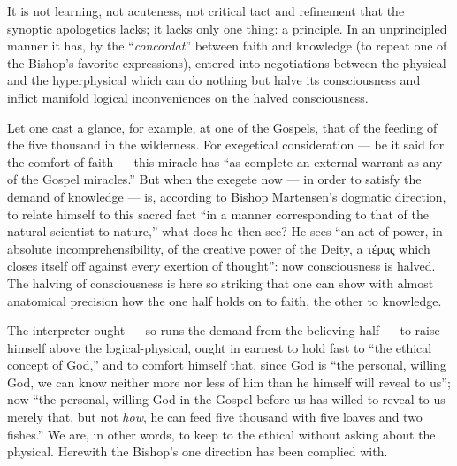 \documentclass[12pt]{book}
\newcommand{\opage}[1]{\marginnote{\footnotesize\textit{[#1]}}}
\begin{document}
It is not learning, not acuteness, not critical tact and refinement that the synoptic apologetics lacks; it lacks only one thing: a principle. In an unprincipled manner it has, by the ``\emph{concordat}'' between faith and knowledge (to repeat one of the Bishop's favorite expressions), entered into negotiations between the physical and the hyperphysical which can do nothing but halve its consciousness and inflict manifold logical inconveniences on the halved consciousness.

Let one cast a glance, for example, at one of the Gospels, that of the feeding of the five thousand in the wilderness. For exegetical consideration --- be it said for the comfort of faith --- this miracle has ``as complete an external warrant as any of the Gospel miracles.'' But when the exegete now --- in order to satisfy the demand of knowledge --- is, according to Bishop Martensen's dogmatic direction, to relate himself to this sacred fact ``in a manner corresponding to that of the natural scientist to nature,'' what does he then see? He sees ``an act of power, in absolute incomprehensibility, of the creative power of the Deity, a τέρας which closes itself off against every exertion of thought'': now consciousness is halved. The halving of consciousness is here so striking that one can show with almost anatomical precision how the one half holds on to faith, the other to knowledge.

The interpreter ought --- so runs the demand from the believing half --- to raise himself above the logical-physical, ought in earnest to hold fast to ``the ethical concept of God,'' and to comfort himself that, since God is ``the personal, willing God, we can know neither
\opage{70}\setcounter{footnote}{0}%
more nor less of him than he himself will reveal to us''; now ``the personal, willing God in the Gospel before us has willed to reveal to us merely that, but not \emph{how}, he can feed five thousand with five loaves and two fishes.'' We are, in other words, to keep to the ethical without asking about the physical. Herewith the Bishop's one direction has been complied with.
\end{document}
